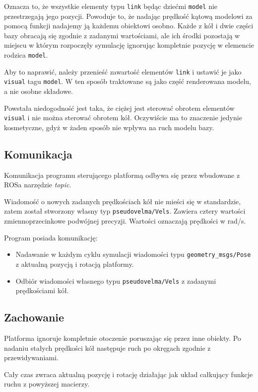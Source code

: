 Oznacza to, że wszystkie elementy typu \texttt{link} będąc dziećmi \texttt{model} nie przestrzegają jego pozycji.
Powoduje to, że nadając prędkość kątową modelowi za pomocą funkcji nadajemy ją każdemu obiektowi osobno.
Każde z kół i dwie części bazy obracają się zgodnie z zadanymi wartościami, ale ich środki pozostają w miejscu w którym rozpoczęły symulację ignorując kompletnie pozycję w elemencie rodzica \texttt{model}.

Aby to naprawić, należy przenieść zawartość elementów \texttt{link} i ustawić je jako \texttt{visual} tagu \texttt{model}.
W ten sposób traktowane są jako część renderowana modelu, a nie osobne składowe.

Powstała niedogodność jest taka, że ciężej jest sterować obrotem elementów \texttt{visual} i nie można sterować obrotem kół.
Oczywiście ma to znaczenie jedynie kosmetyczne, gdyż w żaden sposób nie wpływa na ruch modelu bazy.

\subsection{Komunikacja}
Komunikacja programu sterującego platformą odbywa się przez wbudowane z ROSa narzędzie \emph{topic}.

Wiadomość o nowych zadanych prędkościach kół nie mieści się w standardzie, zatem został stworzony własny typ \texttt{pseudovelma/Vels}.
Zawiera cztery wartości zmiennoprzecinkowe podwójnej precyzji.
Wartości oznaczają prędkości w rad/s.

Program posiada komunikację:
\begin{itemize}
 \item Nadawanie w każdym cyklu symulacji wiadomości typu \texttt{geometry\_msgs/Pose} z aktualną pozycją i rotacją platformy.
 \item Odbiór wiadomości własnego typu \texttt{pseudovelma/Vels} z zadanymi prędkościami kół.
\end{itemize}

\subsection{Zachowanie}
Platforma ignoruje kompletnie otoczenie poruszając się przez inne obiekty.
Po nadaniu stałych prędkości kół następuje ruch po okręgach zgodnie z przewidywaniami.

Cały czas zwraca aktualną pozycję i rotację działając jak układ całkujący funkcje ruchu z powyższej macierzy.

